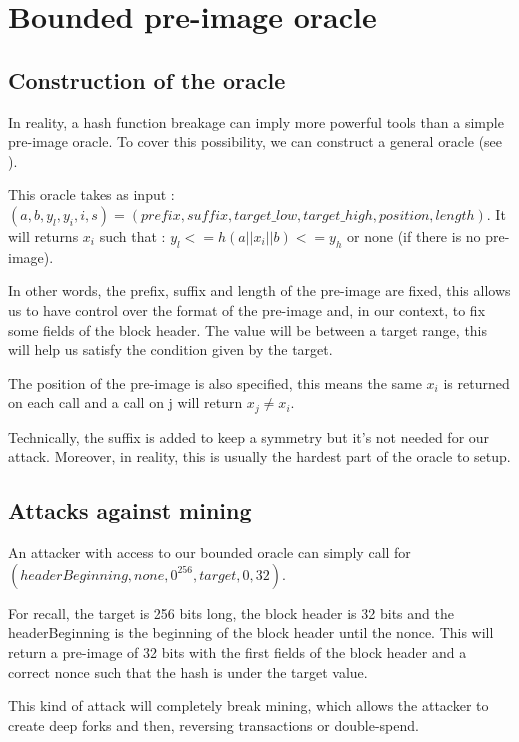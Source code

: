 \section{Bounded pre-image oracle}


  \subsection{Construction of the oracle}

In reality, a hash function breakage can imply more powerful tools than a simple pre-image oracle. To cover this possibility, we can construct a general oracle (see \cite{broken_crypto_primitives}). \newline

This oracle takes as input : $(a, b, y_l, y_i, i, s) = (prefix, suffix, target\_low, target\_high, position, length)$. It will returns $x_i$ such that : $y_l <= h(a || x_i || b) <= y_h$ or none (if there is no pre-image). \newline

In other words, the prefix, suffix and length of the pre-image are fixed, this allows us to have control over the format of the pre-image and, in our context, to fix some fields of the block header. The value will be between a target range, this will help us satisfy the condition given by the target.

The position of the pre-image is also specified, this means the same $x_i$ is returned on each call and a call on j will return $x_j \neq x_i$. \newline

Technically, the suffix is added to keep a symmetry but it's not needed for our attack. Moreover, in reality, this is usually the hardest part of the oracle to setup.

  \subsection{Attacks against mining}


An attacker with access to our bounded oracle can simply call for $(headerBeginning, none, 0^{256}, target, 0, 32)$. \newline

For recall, the target is 256 bits long, the block header is 32 bits and the headerBeginning is the beginning of the block header until the nonce. This will return a pre-image of 32 bits with the first fields of the block header and a correct nonce such that the hash is under the target value. \newline

This kind of attack will completely break mining, which allows the attacker to create deep forks and then, reversing transactions or double-spend.
